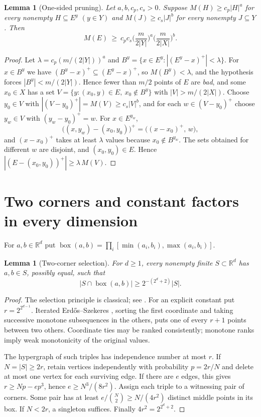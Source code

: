 \documentclass[11pt]{amsart}
\newtheorem{lemma}[theorem]{Lemma}
\theoremstyle{definition}
\theoremstyle{remark}
\newcommand{\R}{\mathbb{R}}
\newcommand{\Mf}{M}
\begin{document}
\begin{lemma}[One-sided pruning]\label{lem:P1}
Let $a,b,c_p,c_s>0$. Suppose $\Mf(H)\ge c_p|H|^a$ for every nonempty $H\subseteq E^y$ $(y\in Y)$ and $\Mf(J)\ge c_s|J|^b$ for every nonempty $J\subseteq Y$. Then
\[
\Mf(E)\ \ge\ c_pc_s\Big(\frac{m}{2|Y|}\Big)^{a}\Big(\frac{m}{2|X|}\Big)^{b}.
\]
\end{lemma}

\begin{proof}
Let $\lambda=c_p(m/(2|Y|))^a$ and $B^y=\{x\in E^y:|(E^y-x)^+|<\lambda\}$. For $x\in B^y$ we have $(B^y-x)^+\subseteq(E^y-x)^+$, so $\Mf(B^y)<\lambda$, and the hypothesis forces $|B^y|<m/(2|Y|)$. Hence fewer than $m/2$ points of $E$ are \emph{bad}, and some $x_0\in X$ has a set $V=\{y:(x_0,y)\in E,\ x_0\notin B^y\}$ with $|V|>m/(2|X|)$. Choose $y_0\in V$ with $|(V-y_0)^+|=\Mf(V)\ge c_s|V|^b$, and for each $w\in(V-y_0)^+$ choose $y_w\in V$ with $(y_w-y_0)^+=w$. For $x\in E^{y_w}$,
\[
\big((x,y_w)-(x_0,y_0)\big)^+=\big((x-x_0)^+,\,w\big),
\]
and $(x-x_0)^+$ takes at least $\lambda$ values because $x_0\notin B^{y_w}$. The sets obtained for different $w$ are disjoint, and $(x_0,y_0)\in E$. Hence $|(E-(x_0,y_0))^+|\ge\lambda\,\Mf(V)$.
\end{proof}

\section{Two corners and constant factors in every dimension}\label{sec:two-corners}

For $a,b\in\R^d$ put $\operatorname{box}(a,b)=\prod_i[\min(a_i,b_i),\max(a_i,b_i)]$.

\begin{lemma}[Two-corner selection]\label{lem:two-corner-box}
For $d\ge1$, every nonempty finite $S\subset\R^d$ has $a,b\in S$, possibly equal, such that
\[
|S\cap\operatorname{box}(a,b)|\ge2^{-(2^d+2)}|S|.
\]
\end{lemma}
\begin{proof}
The selection principle is classical; see \cite[Section 7]{ABKKW}. For an explicit constant put $r=2^{2^{d-1}}$. Iterated Erd\H{o}s--Szekeres \cite{ES35}, sorting the first coordinate and taking successive monotone subsequences in the others, puts one of every $r+1$ points between two others. Coordinate ties may be ranked consistently; monotone ranks imply weak monotonicity of the original values.

The hypergraph of such triples has independence number at most $r$. If $N=|S|\ge2r$, retain vertices independently with probability $p=2r/N$ and delete at most one vertex for each surviving edge. If there are $e$ edges, this gives $r\ge Np-ep^3$, hence $e\ge N^3/(8r^2)$. Assign each triple to a witnessing pair of corners. Some pair has at least $e/\binom N2\ge N/(4r^2)$ distinct middle points in its box. If $N<2r$, a singleton suffices. Finally $4r^2=2^{2^d+2}$.
\end{proof}
\end{document}
